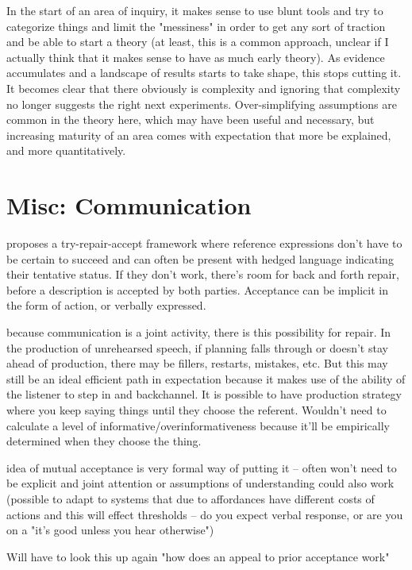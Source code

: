 \documentclass[]{article}
\begin{document}
In the start of an area of inquiry, it makes sense to use blunt tools and try to categorize things and limit the "messiness" in order to get any sort of traction and be able to start a theory (at least, this is a common approach, unclear if I actually think that it makes sense to have as much early theory). As evidence accumulates and a landscape of results starts to take shape, this stops cutting it. It becomes clear that there obviously is complexity and ignoring that complexity no longer suggests the right next experiments. Over-simplifying assumptions are common in the theory here, which may have been useful and necessary, but increasing maturity of an area comes with expectation that more be explained, and more quantitatively. 
\section{Misc: Communication}

\cite{clark1986} proposes a try-repair-accept framework where reference expressions don't have to be certain to succeed and can often be present with hedged language indicating their tentative status. If they don't work, there's room for back and forth repair, before a description is accepted by both parties. Acceptance can be implicit in the form of action, or verbally expressed. 

\cite{clark1986} because communication is a joint activity, there is this possibility for repair. In the production of unrehearsed speech, if planning falls through or doesn't stay ahead of production, there may be fillers, restarts, mistakes, etc. But this may still be an ideal efficient path in expectation because it makes use of the ability of the listener to step in and backchannel. It is possible to have production strategy where you keep saying things until they choose the referent. Wouldn't need to calculate a level of informative/overinformativeness because it'll be empirically determined when they choose the thing. 

\cite{clark1986} idea of mutual acceptance is very formal way of putting it -- often won't need to be explicit and joint attention or assumptions of understanding could also work (possible to adapt to systems that due to affordances have different costs of actions and this will effect thresholds -- do you expect verbal response, or are you on a "it's good unless you hear otherwise") 

\cite{clark1986} Will have to look this up again "how does an appeal to prior acceptance work"
\end{document}
